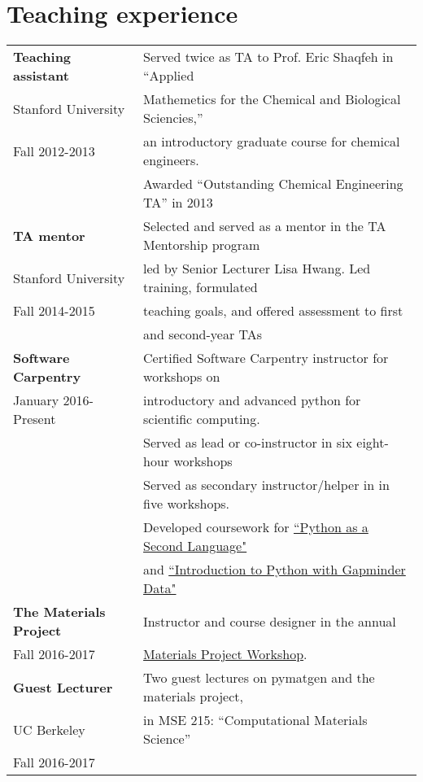\documentclass[a4paper,10pt]{article}
\begin{document}
\section{Teaching experience}
\begin{tabular}{ll}
  \textbf{Teaching assistant}
 & Served twice as TA to Prof. Eric Shaqfeh in ``Applied  \\
  Stanford University &Mathemetics for the Chemical and Biological Sciencies,'' \\
 Fall 2012-2013 &an introductory graduate course for chemical engineers. \vspace{0.05in} \\
 &Awarded ``Outstanding Chemical Engineering TA'' in 2013\vspace{0.13in}\\

  \textbf{TA mentor}
 & Selected and served as a mentor in the TA Mentorship program \\
  Stanford University & led by Senior Lecturer Lisa Hwang. Led training, formulated  \\
 Fall 2014-2015 & teaching goals, and offered assessment to first  \\
& and second-year TAs \vspace{0.13in}\\

 \textbf{Software Carpentry}
  &Certified Software Carpentry instructor for workshops on  \\
 January 2016-Present &introductory and advanced python for scientific computing. \vspace{0.05in} \\
 &Served as lead or co-instructor in six eight-hour workshops \vspace{0.05in} \\ 
 &Served as secondary instructor/helper in in five workshops. \vspace{0.05in} \\
 &Developed coursework for \href{https://swcarpentry.github.io/python-second-language/}{``Python as a Second Language"} \\
 & and \href{https://swcarpentry.github.io/python-novice-gapminder/}{``Introduction to Python with Gapminder Data"}\vspace{0.13in} \\ 

\textbf{The Materials Project} & Instructor and course designer in the annual \\
Fall 2016-2017 & \href{https://github.com/materialsproject/workshop-2017}{Materials Project Workshop}. \vspace{0.13in}\\

\textbf{Guest Lecturer} & Two guest lectures on pymatgen and the materials project, \\ 
UC Berkeley & in MSE 215: ``Computational Materials Science'' \\
Fall 2016-2017 & 
 \end{tabular} \vspace{0.2in}
\end{document}
